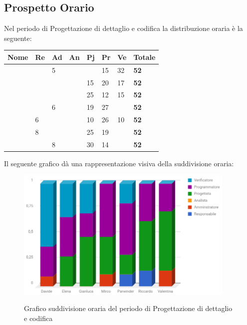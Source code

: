 \documentclass[PianoDiProgetto.tex]{subfiles}
\begin{document}
\subsection{Prospetto Orario}
Nel periodo di Progettazione di dettaglio e codifica la distribuzione oraria è la seguente:
\begin{center}
	\begin{table}[htbp]
		\centering
		\renewcommand\arraystretch{1.5}
		\begin{tabularx}{\textwidth}{p{4cm}|p{1cm}|p{1cm}|p{1cm}|p{1cm}|p{1cm}|p{1cm}|p{2cm}}
			\hline
			\textbf{Nome} & \textbf{Re} & \textbf{Ad} & \textbf{An} & \textbf{Pj} & \textbf{Pr} & \textbf{Ve} & \textbf{Totale} \\
			\hline
			\Davide & \ & 5 & \ & \ & 15 & 32 & \textbf{52} \\
			\hline
			\Elena & \ & \ & \ & 15 & 20 & 17 & \textbf{52} \\
			\hline
			\Gianluca & \ & \ & \ & 25 & 12 & 15 & \textbf{52} \\
			\hline
			\Mirco & \ & 6 & \ & 19 & 27 & \ & \textbf{52} \\
			\hline
			\Parwinder & 6 & \ & \ & 10 & 26 & 10 & \textbf{52} \\
			\hline
			\Riccardo & 8 & \ & \ & 25 & 19 & \ & \textbf{52} \\
			\hline
			\Valentina & \ & 8 & \ & 30 & 14 & \ & \textbf{52} \\
			\hline
		\end{tabularx}
	\end{table} 	
\end{center}
Il seguente grafico dà una rappresentazione visiva della suddivisione oraria:
\begin{figure}[h]
	\includegraphics[width=10.5cm]{images/prospettoOrario/progCod.png}
	\label{fig:foo}
	\caption{Grafico suddivisione oraria del periodo di Progettazione di dettaglio e codifica}
\end{figure} 
\newpage
\end{document}
